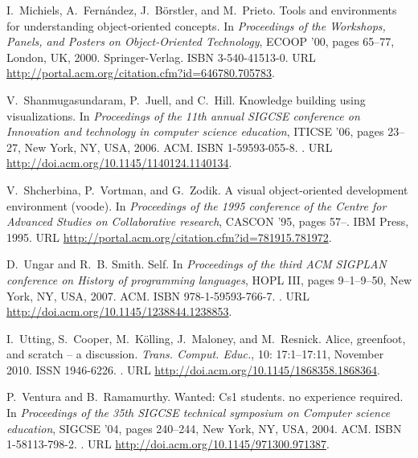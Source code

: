 \documentclass{sigplanconf}
\begin{document}
\begin{thebibliography}{}
I.~Michiels, A.~Fern\'{a}ndez, J.~B\"{o}rstler, and M.~Prieto.
\newblock Tools and environments for understanding object-oriented concepts.
\newblock In \emph{Proceedings of the Workshops, Panels, and Posters on
  Object-Oriented Technology}, ECOOP '00, pages 65--77, London, UK, 2000.
  Springer-Verlag.
\newblock ISBN 3-540-41513-0.
\newblock URL \url{http://portal.acm.org/citation.cfm?id=646780.705783}.

V.~Shanmugasundaram, P.~Juell, and C.~Hill.
\newblock Knowledge building using visualizations.
\newblock In \emph{Proceedings of the 11th annual SIGCSE conference on
  Innovation and technology in computer science education}, ITICSE '06, pages
  23--27, New York, NY, USA, 2006. ACM.
\newblock ISBN 1-59593-055-8.
\newblock {}.
\newblock URL \url{http://doi.acm.org/10.1145/1140124.1140134}.

V.~Shcherbina, P.~Vortman, and G.~Zodik.
\newblock A visual object-oriented development environment (voode).
\newblock In \emph{Proceedings of the 1995 conference of the Centre for
  Advanced Studies on Collaborative research}, CASCON '95, pages 57--. IBM
  Press, 1995.
\newblock URL \url{http://portal.acm.org/citation.cfm?id=781915.781972}.

D.~Ungar and R.~B. Smith.
\newblock Self.
\newblock In \emph{Proceedings of the third ACM SIGPLAN conference on History
  of programming languages}, HOPL III, pages 9--1--9--50, New York, NY, USA,
  2007. ACM.
\newblock ISBN 978-1-59593-766-7.
\newblock {}.
\newblock URL \url{http://doi.acm.org/10.1145/1238844.1238853}.

I.~Utting, S.~Cooper, M.~K\"{o}lling, J.~Maloney, and M.~Resnick.
\newblock Alice, greenfoot, and scratch -- a discussion.
\newblock \emph{Trans. Comput. Educ.}, 10: 17:1--17:11, November 2010.
\newblock ISSN 1946-6226.
\newblock {}.
\newblock URL \url{http://doi.acm.org/10.1145/1868358.1868364}.

P.~Ventura and B.~Ramamurthy.
\newblock Wanted: Cs1 students. no experience required.
\newblock In \emph{Proceedings of the 35th SIGCSE technical symposium on
  Computer science education}, SIGCSE '04, pages 240--244, New York, NY, USA,
  2004. ACM.
\newblock ISBN 1-58113-798-2.
\newblock {}.
\newblock URL \url{http://doi.acm.org/10.1145/971300.971387}.


\end{thebibliography}
\end{document}

